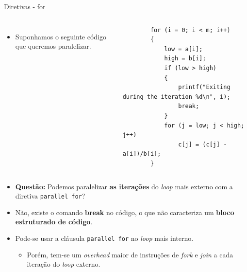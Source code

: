 \begin{frame}[fragile]{Diretivas - for}
	\begin{columns}
		\begin{itemize}
			\item Suponhamos o seguinte código que queremos paralelizar.
		\end{itemize}
		\begin{verbatim}
		for (i = 0; i < m; i++)
		{
			low = a[i];
			high = b[i];
			if (low > high)
			{
				printf("Exiting during the iteration %d\n", i);
				break;
			}
			for (j = low; j < high; j++)
				c[j] = (c[j] - a[i])/b[i];
		}
		\end{verbatim}
	\end{columns}
	\fontsize{8pt}{7.2}\selectfont
	\begin{itemize}
		\item \textbf{Questão:} Podemos paralelizar \textbf{as iterações} do \textit{loop} mais externo com a diretiva \texttt{parallel for}?
		\pause
		\medskip
		\item {\color{bostonuniversityred} Não, existe o comando \textbf{break} no código, o que não caracteriza um \textbf{bloco estruturado de código}.}
		\pause
		\item Pode-se usar a cláusula \texttt{parallel for} no \textit{loop} mais interno.
		\pause
		\medskip
		\begin{itemize}
			\item Porém, tem-se um \textit{overhead} maior de instruções de \textit{fork} e \textit{join} a cada iteração do \textit{loop} externo.
		\end{itemize}
	\end{itemize}
\end{frame}

